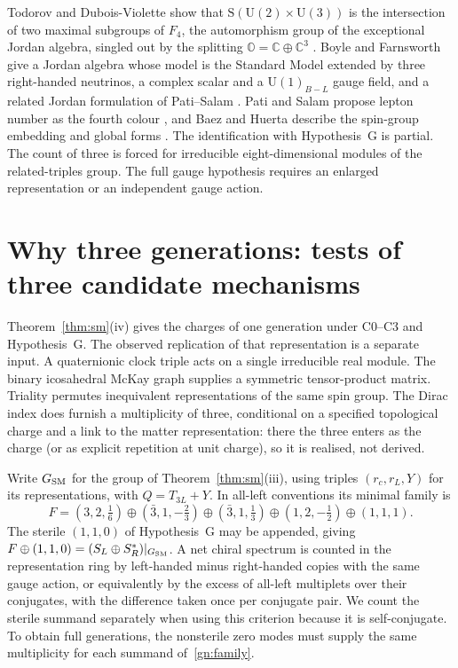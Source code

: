 \documentclass[aps,pra,onecolumn,superscriptaddress,nofootinbib,10pt]{revtex4-2}
\theoremstyle{definition}
\theoremstyle{remark}
\newcommand{\U}{\mathrm{U}}
\begin{document}
Todorov and Dubois-Violette show that $\mathrm S(\U(2)\times\U(3))$ is the intersection of two maximal subgroups of
$F_4$, the automorphism group of the exceptional Jordan algebra, singled out by the splitting
\(\mathbb O=\mathbb C\oplus\mathbb C^3\) \cite{tr:TodorovDV}.  Boyle and Farnsworth give a Jordan algebra whose
model is the Standard Model extended by three right-handed neutrinos, a complex scalar and a $\U(1)_{B-L}$ gauge
field, and a related Jordan formulation of Pati--Salam \cite{tr:BoyleFarnsworth}. Pati and Salam propose
lepton number as the fourth colour \cite{PatiSalam}, and
Baez and Huerta describe the spin-group embedding and global
forms \cite[\S3]{BaezHuerta}.
The identification with Hypothesis~G is partial. The count of
three is forced for irreducible eight-dimensional modules of
the related-triples group. The full gauge hypothesis requires
an enlarged representation or an independent gauge action.

\section{Why three generations: tests of three candidate mechanisms}\label{sec:generations}

Theorem~\ref{thm:sm}(iv) gives the charges of one generation under
C0--C3 and Hypothesis~G. The observed replication of that representation is a separate
input. A quaternionic clock triple acts on a single irreducible real module.
The binary icosahedral McKay graph supplies a symmetric tensor-product
matrix. Triality permutes inequivalent representations of the same spin
group. The Dirac index does furnish a multiplicity of three, conditional on
a specified topological charge and a link to the matter representation: there the
three enters as the charge (or as explicit repetition at unit charge), so it is realised, not derived.

Write $G_{\rm SM}$ for the group of Theorem~\ref{thm:sm}(iii), using triples
$(r_c,r_L,Y)$ for its representations, with $Q=T_{3L}+Y$. In all-left
conventions its minimal family is
\begin{equation}\label{gn:family}
 F=(3,2,\tfrac16)\oplus(\bar3,1,-\tfrac23)\oplus
   (\bar3,1,\tfrac13)\oplus(1,2,-\tfrac12)\oplus(1,1,1).
\end{equation}
The sterile $(1,1,0)$ of Hypothesis~G may be appended, giving
$F\oplus(1,1,0)=(S_L\oplus S_R^*)|_{G_{\rm SM}}$.
A net chiral spectrum is counted in the representation ring by
left-handed minus right-handed copies with the same gauge action, or
equivalently by the excess of all-left multiplets over their conjugates,
with the difference taken once per conjugate pair. We count the sterile
summand separately when using this criterion because it is self-conjugate.
To obtain full generations, the nonsterile zero modes must supply the
same multiplicity for each summand of~\eqref{gn:family}.
\end{document}
